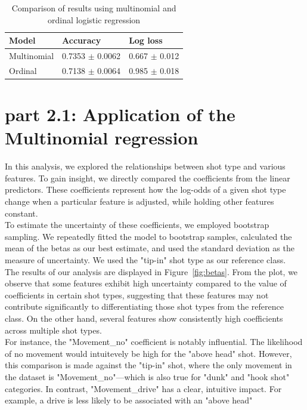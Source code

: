 \documentclass[9pt]{IEEEtran}
\begin{document}
 \begin{table}[h]
    \centering
    \begin{tabular}{l|l|l}
    Model       & Accuracy & Log loss          \\ 
    \hline
    Multinomial  & 0.7353 $\pm$ 0.0062 & 0.667 $\pm$ 0.012 \\
    Ordinal  & 0.7138 $\pm$ 0.0064& 0.985 $\pm$ 0.018\\

    \end{tabular}
    \vspace{2px}
    \caption{Comparison of results using multinomial and ordinal logistic regression}
    \label{tab:results}
\end{table}

\section{part 2.1: Application of the Multinomial regression}
In this analysis, we explored the relationships between shot type and various features.
 To gain insight, we directly compared the coefficients from the linear predictors. These 
 coefficients represent how the log-odds of a given shot type change when a particular feature
  is adjusted, while holding other features constant.\\
To estimate the uncertainty of these coefficients, we employed bootstrap sampling.
 We repeatedly fitted the model to bootstrap samples, calculated the mean of the betas
  as our best estimate, and used the standard deviation as the measure of uncertainty. 
  We used the "tip-in" shot type as our reference class.\\
The results of our analysis are displayed in Figure~\ref{fig:betas}. From the plot, we 
observe that some features exhibit high uncertainty compared to the value of coefficients 
in certain shot types, suggesting that these features may not contribute significantly to 
differentiating those shot types from the reference class. On the other hand, several features
 show consistently high coefficients across multiple shot types.\\
For instance, the "Movement\_no" coefficient is notably influential. The likelihood of no
 movement would intuitevely be high for the "above head" shot. However, this comparison is
  made against the "tip-in" shot, where the only movement in the dataset  is "Movement\_no"—which
   is also true for "dunk" and "hook shot" categories. In contrast, "Movement\_drive" has a clear,
    intuitive impact. For example, a drive is less likely to be associated with an "above head"
\end{document}
